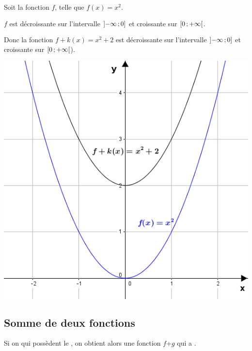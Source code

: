 \documentclass[12pt,a4paper]{article}
\begin{document}
	\begin{myex}
		\begin{multicols}{2}
			\vspace*{1cm}
			
			Soit la fonction $f$, telle que $f(x) = x^2$.
			
			$f$ est décroissante sur l'intervalle $\mbox{\ensuremath{\left]-\infty\mathpunct{};0\right]}} $ et croissante sur $\mbox{\ensuremath{\left[0\mathpunct{};+\infty\right[}}$.
			
			Donc la fonction $f+k(x) = x^2 + 2 $ est décroissante sur l'intervalle $\mbox{\ensuremath{\left]-\infty\mathpunct{};0\right]}} $ et croissante sur $\mbox{\ensuremath{\left[0\mathpunct{};+\infty\right[}}$).
			
			\includegraphics[scale=0.6]{./img/k+f}
		\end{multicols}
	\end{myex}
	
	\subsection{Somme de deux fonctions}
	
	\begin{myprop}
		Si on  qui possèdent le , on obtient alors une fonction $f$+$g$ qui a . 
	\end{myprop}
	
\end{document}
